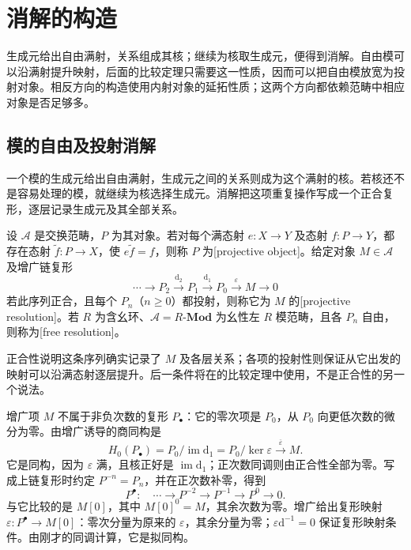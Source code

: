 
\section{消解的构造}
\label{b4:sec:0701}

生成元给出自由满射，关系组成其核；继续为核取生成元，便得到消解。自由模可以沿满射提升映射，后面的比较定理只需要这一性质，因而可以把自由模放宽为投射对象。相反方向的构造使用内射对象的延拓性质；这两个方向都依赖范畴中相应对象是否足够多。


%
%

\subsection{模的自由及投射消解}
\label{b4:subsec:0701:01}

一个模的生成元给出自由满射，生成元之间的关系则成为这个满射的核。若核还不是容易处理的模，就继续为核选择生成元。消解把这项重复操作写成一个正合复形，逐层记录生成元及其全部关系。

\begin{definition}\label{b4:def:projective-resolution}
	设 \(\mathcal A\) 是交换范畴，\(P\) 为其对象。若对每个满态射 \(e:X\to Y\) 及态射 \(f:P\to Y\)，都存在态射 \(\widetilde f:P\to X\)，使 \(e\widetilde f=f\)，则称 \(P\) 为[projective object]。给定对象 \(M\in\mathcal A\) 及增广链复形
	\[
		\cdots\longrightarrow P_2\xrightarrow{\mathrm{d}_2}P_1 \xrightarrow{\mathrm{d}_1}P_0\xrightarrow{\varepsilon}M\longrightarrow0
	\]
	若此序列正合，且每个 \(P_n\)（\(n\ge0\)）都投射，则称它为 \(M\) 的[projective resolution]。若 \(R\) 为含幺环、\(\mathcal A=R\text{-}\mathbf{Mod}\) 为幺性左 \(R\) 模范畴，且各 \(P_n\) 自由，则称为[free resolution]。
\end{definition}

正合性说明这条序列确实记录了 \(M\) 及各层关系；各项的投射性则保证从它出发的映射可以沿满态射逐层提升。后一条件将在的比较定理中使用，不是正合性的另一个说法。

\ProseParagraphBreak
增广项 \(M\) 不属于非负次数的复形 \(P_\bullet\)：它的零次项是 \(P_0\)，从 \(P_0\) 向更低次数的微分为零。由增广诱导的商同构是
\[
	H_0(P_\bullet)=P_0/\operatorname{im}\mathrm{d}_1 =P_0/\ker\varepsilon\xrightarrow{\;\overline\varepsilon\;}M.
\]
它是同构，因为 \(\varepsilon\) 满，且核正好是 \(\operatorname{im}\mathrm{d}_1\)；正次数同调则由正合性全部为零。写成上链复形时约定 \(P^{-n}=P_n\)，并在正次数补零，得到
\[
	P^\bullet:\quad\cdots\longrightarrow P^{-2}\longrightarrow P^{-1} \longrightarrow P^0\longrightarrow0.
\]
与它比较的是 \(M[0]\)，其中 \(M[0]^0=M\)，其余次数为零。增广给出复形映射 \(\varepsilon:P^\bullet\to M[0]\)：零次分量为原来的 \(\varepsilon\)，其余分量为零；\(\varepsilon\mathrm{d}^{-1}=0\) 保证复形映射条件。由刚才的同调计算，它是拟同构。

